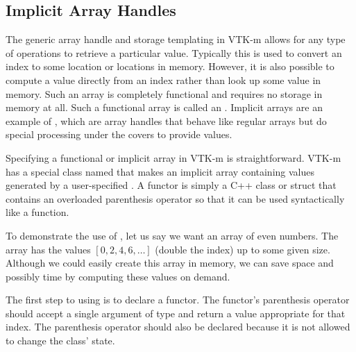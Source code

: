 



\subsection{Implicit Array Handles}


The generic array handle and storage templating in VTK-m allows for
any type of operations to retrieve a particular value. Typically this is
used to convert an index to some location or locations in memory. However,
it is also possible to compute a value directly from an index rather than
look up some value in memory. Such an array is completely functional and
requires no storage in memory at all. Such a functional array is called an
. Implicit arrays are an example of
, which are array handles that behave like
regular arrays but do special processing under the covers to provide
values.

Specifying a functional or implicit array in VTK-m is straightforward.
VTK-m has a special class named  that makes
an implicit array containing values generated by a user-specified
.  A functor is simply a C++ class or
struct that contains an overloaded parenthesis operator so that it can be
used syntactically like a function.

To demonstrate the use of , let us say
we want an array of even numbers. The array has the values
$[0,2,4,6,\ldots]$ (double the index) up to some given size. Although we
could easily create this array in memory, we can save space and possibly
time by computing these values on demand.

The first step to using  is to declare
a functor. The functor's parenthesis operator should accept a single
argument of type  and return a value appropriate for that index.
The parenthesis operator should also be declared  because
it is not allowed to change the class' state.

